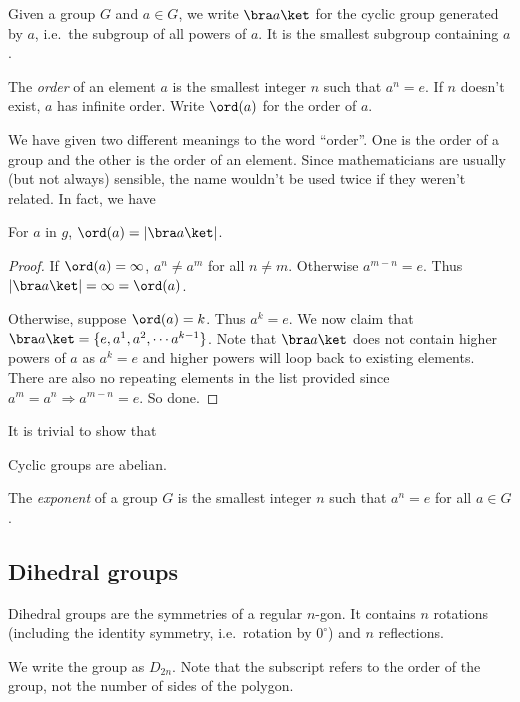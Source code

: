 \documentclass[a4paper]{article}
\begin{document}
\begin{notation}
  Given a group $G$ and $a\in G$, we write $\bra a\ket$ for the cyclic group generated by $a$, i.e.\ the subgroup of all powers of $a$. It is the smallest subgroup containing $a$.
\end{notation}

\begin{defi}
  The \emph{order} of an element $a$ is the smallest integer $n$ such that $a^n = e$. If $n$ doesn't exist, $a$ has infinite order. Write $\ord(a)$ for the order of $a$.
\end{defi}
We have given two different meanings to the word ``order''. One is the order of a group and the other is the order of an element. Since mathematicians are usually (but not always) sensible, the name wouldn't be used twice if they weren't related. In fact, we have

\begin{lemma}
  For $a$ in $g$, $\ord (a) = |\bra a\ket|$.
\end{lemma}
\begin{proof}
  If $\ord (a) = \infty$, $a^n \not= a^m$ for all $n\not= m$. Otherwise $a^{m-n} = e$. Thus $|\bra a\ket| = \infty = \ord (a)$.

  Otherwise, suppose $\ord (a) = k$. Thus $a^k = e$. We now claim that $\bra a\ket = \{e, a^1, a^2, \cdots a^{k-1}\}$. Note that $\bra a\ket$ does not contain higher powers of $a$ as $a^k = e$ and higher powers will loop back to existing elements. There are also no repeating elements in the list provided since $a^m = a^n \Rightarrow a^{m-n} = e$. So done.
\end{proof}

It is trivial to show that
\begin{prop}
  Cyclic groups are abelian.
\end{prop}

\begin{defi}
  The \emph{exponent} of a group $G$ is the smallest integer $n$ such that $a^n = e$ for all $a \in G$.
\end{defi}

\subsection{Dihedral groups}
\begin{defi}
  Dihedral groups are the symmetries of a regular $n$-gon. It contains $n$ rotations (including the identity symmetry, i.e.\ rotation by $0^\circ$) and $n$ reflections.

  We write the group as $D_{2n}$. Note that the subscript refers to the order of the group, not the number of sides of the polygon.
\end{defi}
\end{document}
